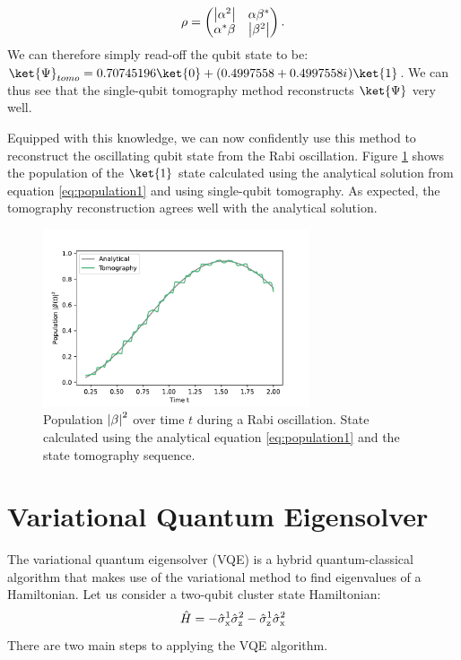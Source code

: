 \begin{equation}
\rho = \begin{pmatrix} \left|\alpha^2\right|& \alpha\beta^*\\\alpha^*\beta& \left|\beta^2\right| \end{pmatrix}.
\end{equation}
We can therefore simply read-off the qubit state to be: $\ket{\Psi}_{tomo} = 0.70745196 \ket{0} + (0.4997558 +0.4997558\iu) \ket{1}$. We can thus see that the single-qubit tomography method reconstructs $\ket{\Psi}$ very well.

Equipped with this knowledge, we can now confidently use this method to reconstruct the oscillating qubit state from the Rabi oscillation. Figure \ref{fig:tomo} shows the population of the $\ket{1}$ state calculated using the analytical solution from equation \eqref{eq:population1} and using single-qubit tomography. As expected, the tomography reconstruction agrees well with the analytical solution.

\begin{figure}[h]
    \centering
    \includegraphics[width = 0.7\textwidth]{tex/figures/exercise10.pdf}
    \caption{Population $\left|\beta\right|^2$ over time $t$ during a Rabi oscillation. State calculated using the analytical equation \eqref{eq:population1} and the state tomography sequence.}
    \label{fig:tomo}
\end{figure}

\section{Variational Quantum Eigensolver}
The variational quantum eigensolver (VQE) is a hybrid
quantum-classical algorithm that makes use of the variational method to find eigenvalues of a Hamiltonian. Let us consider a two-qubit cluster state Hamiltonian:
\begin{equation}
    \hat{H} = -\sigmax^1\sigmaz^2 - \sigmaz^1\sigmax^2
    \label{eq:HamVQE}
\end{equation} There are two main steps to applying the VQE algorithm. 

